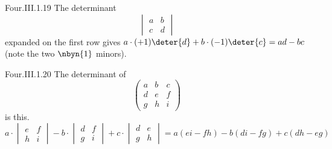 \begin{ans}{Four.III.1.19}
       The determinant
       \begin{equation*}
         \begin{vmatrix}
           a  &b  \\
           c  &d
         \end{vmatrix}
       \end{equation*}
       expanded on the first row gives
       \( a\cdot (+1)\deter{d}+b\cdot (-1)\deter{c}=ad-bc \)
       (note the two $\nbyn{1}$ minors).
     
\end{ans}
\begin{ans}{Four.III.1.20}
      The determinant of
      \begin{equation*}
        \begin{pmatrix}
          a  &b  &c  \\
          d  &e  &f  \\
          g  &h  &i
        \end{pmatrix}
      \end{equation*}
      is this.
      \begin{equation*}
        a\cdot \begin{vmatrix}
            e  &f  \\
            h  &i
         \end{vmatrix}
        -b\cdot \begin{vmatrix}
            d  &f  \\
            g  &i
         \end{vmatrix}
        +c\cdot \begin{vmatrix}
            d  &e  \\
            g  &h
         \end{vmatrix}
        =a(ei-fh)-b(di-fg)+c(dh-eg)
      \end{equation*}
    
\end{ans}
